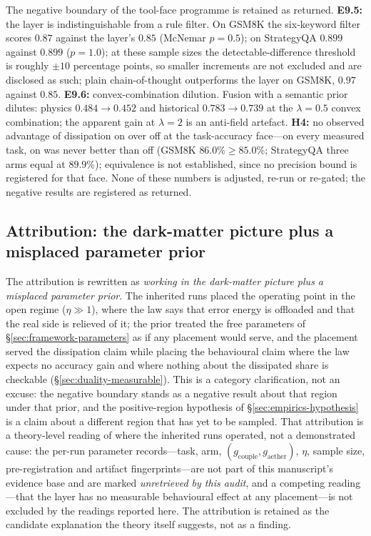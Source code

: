 \documentclass[11pt,a4paper]{article}
\newcommand{\gcouple}{g_{\mathrm{couple}}}
\newcommand{\gaether}{g_{\mathrm{aether}}}
\begin{document}
The negative boundary of the tool-face programme is retained as returned. \textbf{E9.5:} the layer is indistinguishable from a rule filter. On GSM8K the six-keyword filter scores $0.87$ against the layer's $0.85$ (McNemar $p=0.5$); on StrategyQA $0.899$ against $0.899$ ($p=1.0$); at these sample sizes the detectable-difference threshold is roughly $\pm10$ percentage points, so smaller increments are not excluded and are disclosed as such; plain chain-of-thought outperforms the layer on GSM8K, $0.97$ against $0.85$. \textbf{E9.6:} convex-combination dilution. Fusion with a semantic prior dilutes: physics $0.484 \to 0.452$ and historical $0.783 \to 0.739$ at the $\lambda = 0.5$ convex combination; the apparent gain at $\lambda = 2$ is an anti-field artefact. \textbf{H4:} no observed advantage of dissipation on over off at the task-accuracy face---on every measured task, on was never better than off (GSM8K $86.0\% \ge 85.0\%$; StrategyQA three arms equal at $89.9\%$); equivalence is not established, since no precision bound is registered for that face. None of these numbers is adjusted, re-run or re-gated; the negative results are registered as returned.

\subsection{Attribution: the dark-matter picture plus a misplaced parameter prior}
\label{sec:boundary-attribution}

The attribution is rewritten as \emph{working in the dark-matter picture plus a misplaced parameter prior}. The inherited runs placed the operating point in the open regime ($\eta \gg 1$), where the law says that error energy is offloaded and that the real side is relieved of it; the prior treated the free parameters of \S\ref{sec:framework-parameters} as if any placement would serve, and the placement served the dissipation claim while placing the behavioural claim where the law expects no accuracy gain and where nothing about the dissipated share is checkable (\S\ref{sec:duality-measurable}). This is a category clarification, not an excuse: the negative boundary stands as a negative result about that region under that prior, and the positive-region hypothesis of \S\ref{sec:empirics-hypothesis} is a claim about a different region that has yet to be sampled. That attribution is a theory-level reading of where the inherited runs operated, not a demonstrated cause: the per-run parameter records---task, arm, $(\gcouple,\gaether)$, $\eta$, sample size, pre-registration and artifact fingerprints---are not part of this manuscript's evidence base and are marked \emph{unretrieved by this audit}, and a competing reading---that the layer has no measurable behavioural effect at any placement---is not excluded by the readings reported here. The attribution is retained as the candidate explanation the theory itself suggests, not as a finding.
\end{document}
